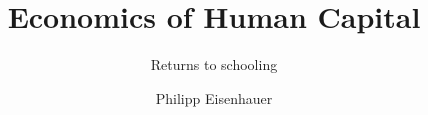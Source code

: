 

\title{Economics of Human Capital}
\subtitle{\vspace{0.3cm}Returns to schooling}
\author{Philipp Eisenhauer}

\date{}

\let\otp\titlepage

